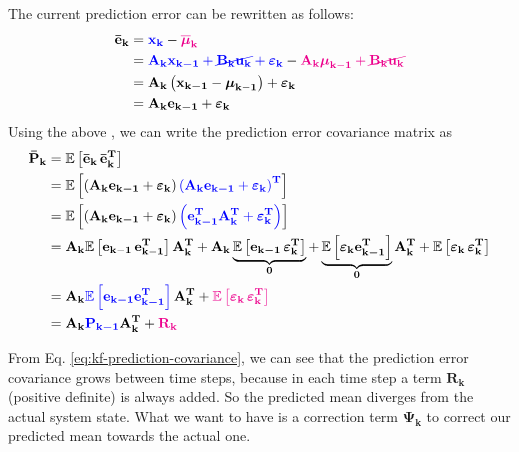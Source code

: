 \documentclass[12pt]{article}
\newcommand{\bvec}[1]{\boldsymbol{\mathbf{#1}}} %
\newcommand{\bvecT}[1]{\boldsymbol{\mathbf{#1^T}}} %
\newcommand{\mat}[1]{\boldsymbol{\mathbf{#1}}}
\newcommand{\matT}[1]{\boldsymbol{\mathbf{#1^T}}}
\newcommand{\brac}[1]{\left[#1\right]} %
\newcommand{\parentheses}[1]{\left(#1\right)}
\newcommand{\mb}[1]{{\boldsymbol{#1}}} %
\newcommand{\expv}[1]{\mathbb{E}\brac{#1}} %
\newcommand{\eps}{\varepsilon}
\newcommand{\blue}[1]{\color{blue}#1\color{black}}
\newcommand{\magenta}[1]{\color{magenta}#1\color{black}}
\begin{document}
The current prediction error can be rewritten as follows:
\begin{equation}
    \begin{aligned}
        \bvec{\bar{e}_k} &= \blue{\bvec{x_k}} - \magenta{\mb{\overline{\mu}}_\mathbf{k}} \\
        &= \blue{\mat{A_k}\bvec{x_{k-1}} + \cancel{\mat{B_k}\bvec{u_k}} + \mb{\eps}_\mathbf{k}} - \magenta{\mat{A_k} \mb{\mu}_\mathbf{k-1} + \cancel{\mat{B_k}\bvec{u_k}} }\\
        &= \mat{A_k}\parentheses{\bvec{x_{k-1}} - \mb{\mu}_\mathbf{k-1}} + \mb{\eps}_\mathbf{k} \\
        &= \mat{A_k}\bvec{e_{k-1}} + \mb{\eps}_\mathbf{k}
    \end{aligned}
\end{equation}
Using the above , we can write the prediction error covariance matrix as
\begin{equation}
    \begin{aligned}
        \mat{\bar{P}_k} &= \expv{\bvec{\bar{e}_k} \, \bvecT{\bar{e}_k}}\\
        &= \expv{\parentheses{\mat{A_k}\bvec{e_{k-1}} + \mb{\varepsilon}_\mathbf{k}} \blue{\parentheses{\mat{A_k}\bvec{e_{k-1}} + \mb{\varepsilon}_\mathbf{k}}^\mathbf{T}}}\\
        &= \expv{\parentheses{\mat{A_k}\bvec{e_{k-1}} + \mb{\varepsilon}_\mathbf{k}} \blue{\parentheses{\bvecT{e_{k-1}}\matT{A_k} + \mb{\varepsilon}_\mathbf{k}^\mathbf{T}}}}\\
        &= \mat{A_k}\expv{\mathbf{e_{k-1}\,e_{k-1}^T}}\matT{A_k} + \mat{A_k}\underbrace{\expv{\bvec{e_{k-1}}\,\mb{\eps}_\mathbf{k}^\mathbf{T}}}_{\mat{0}}+ \underbrace{\expv{\mb{\varepsilon}_\mathbf{k}\bvecT{e_{k-1}}}}_{\mat{0}}\matT{A_k} + \expv{\mb{\varepsilon}_\mathbf{k}\,\mb{\varepsilon}_\mathbf{k}^\mathbf{T}}\\
        &= \mat{A_k} \blue{\expv{\bvec{e_{k-1}} \bvecT{e_{k-1}}}} \matT{A_k} + \magenta{\expv{\mb{\varepsilon}_\mathbf{k}\,\mb{\varepsilon}_\mathbf{k}^\mathbf{T}}}\\
        &= \mat{A_k} \blue{\mat{P_{k-1}}} \matT{A_k} + \magenta{\mat{R_k}}
    \end{aligned}
    \label{eq:kf-prediction-covariance}
\end{equation}

From Eq. \ref{eq:kf-prediction-covariance}, we can see that the prediction error covariance grows between time steps, because in each time step a term $\mat{R_k}$ (positive definite) is always added. So the predicted mean diverges from the actual system state. What we want to have is a correction term $\mat{\Psi_k}$ to correct our predicted mean towards the actual one.
\end{document}
